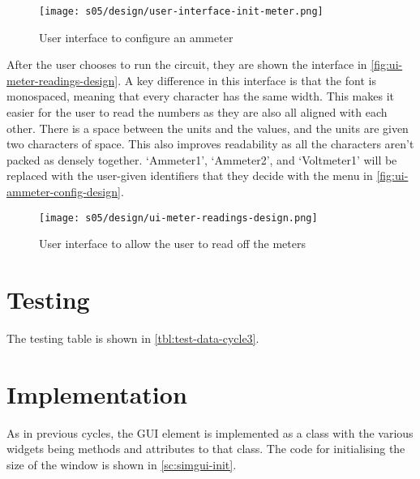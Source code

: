         \begin{figure}[!ht]
            \centering
            \texttt{[image: s05/design/user-interface-init-meter.png]}
            \caption{User interface to configure an ammeter}
            \label{fig:ui-ammeter-config-design}
        \end{figure}

        After the user chooses to run the circuit, they are shown the interface in \autoref{fig:ui-meter-readings-design}. 
        A key difference in this interface is that the font is monospaced, meaning that every character has the same width.
        This makes it easier for the user to read the numbers as they are also all aligned with each other. 
        There is a space between the units and the values, and the units are given two characters of space. 
        This also improves readability as all the characters aren't packed as densely together. 
        `Ammeter1', `Ammeter2', and `Voltmeter1' will be replaced with the user-given identifiers that they decide with the menu in \autoref{fig:ui-ammeter-config-design}. 

        \begin{figure}[!ht]
            \centering
            \texttt{[image: s05/design/ui-meter-readings-design.png]}
            \caption{User interface to allow the user to read off the meters}
            \label{fig:ui-meter-readings-design}
        \end{figure}



\newpage
\section{Testing}

    The testing table is shown in \autoref{tbl:test-data-cycle3}.

\section{Implementation}



    As in previous cycles, the GUI element is implemented as a class with the various widgets being methods and attributes to that class. The code for initialising the size of the window is shown in \autoref{sc:simgui-init}. 

